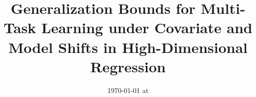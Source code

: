 \documentclass{article}
\begin{document}
\title{Generalization Bounds for Multi-Task Learning under Covariate and Model Shifts in High-Dimensional Regression}
\date{}
\maketitle
\date{{\ddmmyyyydate\today} at \currenttime}






%


	
	
\end{document}
